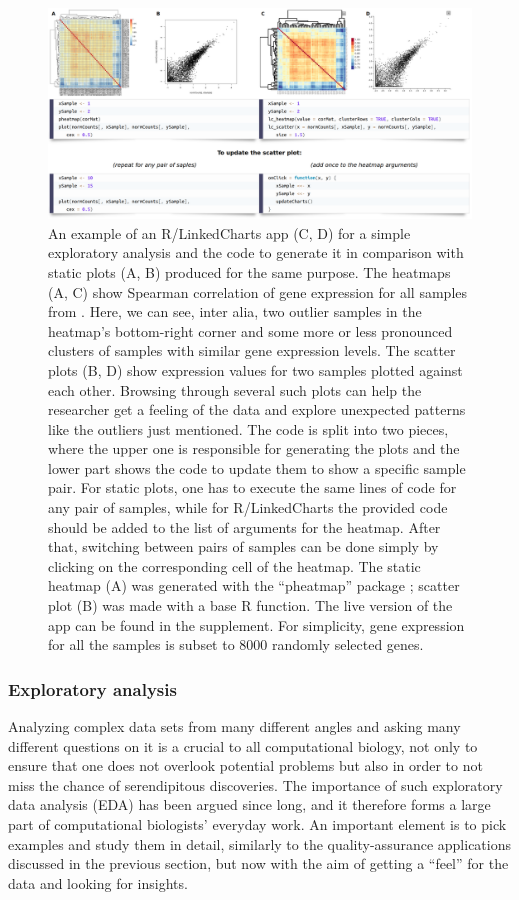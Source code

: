 \documentclass[twocolumn,10pt]{article}
\begin{document}
\begin{figure}[t]
	\includegraphics[width=\textwidth]{FigE/figE.png}
	\caption{An example of an R/LinkedCharts app (C, D) for a simple exploratory analysis and the code to generate it in comparison with static plots (A, B) produced for the same purpose. The heatmaps (A, C) show Spearman correlation of gene expression for all samples from \citet{conway_2015}. Here, we can see, inter alia, two outlier samples in the heatmap's bottom-right corner and some more or less pronounced clusters of samples with similar gene expression levels. The scatter plots (B, D) show expression values for two samples plotted against each other. Browsing through several such plots can help the researcher get a feeling of the data and explore unexpected patterns like the outliers just mentioned. The code is split into two pieces, where the upper one is responsible for generating the plots and the lower part shows the code to update them to show a specific sample pair. For static plots, one has to execute the same lines of code for any pair of samples, while for R/LinkedCharts the provided code should be added to the list of arguments for the heatmap. After that, switching between pairs of samples can be done simply by clicking on the corresponding cell of the heatmap. The static heatmap (A) was generated with the ``pheatmap'' package  \citep{kolde_2019}; scatter plot (B) was made with a base R function. The live version of the app can be found in the supplement. For simplicity, gene expression for all the samples is subset to 8000 randomly selected genes.}
	\label{FigE}
\end{figure}

\subsubsection{Exploratory analysis}

Analyzing complex data sets from many different angles and asking many different questions on it is a crucial to all computational biology, not only to ensure that one does not overlook potential problems but also in order to not miss the chance of serendipitous discoveries. The importance of such exploratory data analysis (EDA) has been argued since long, and it therefore forms a large part of computational biologists' everyday work. An important element is to pick examples and study them in detail, similarly to the quality-assurance applications discussed in the previous section, but now with the aim of getting a ``feel'' for the data and looking for insights.
\end{document}
